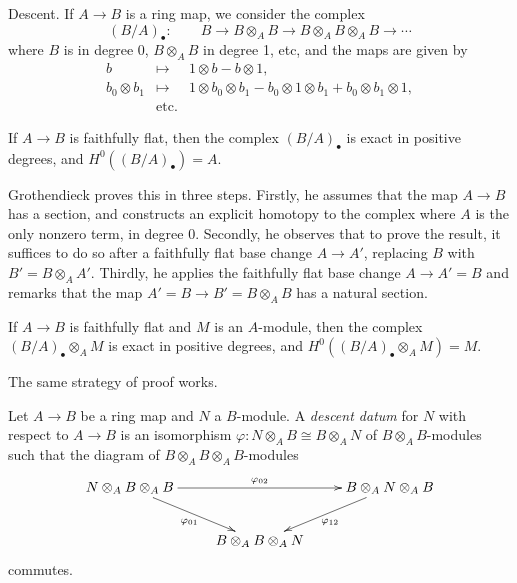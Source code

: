 \medskip\noindent
Descent. If $A \to B$ is a ring map, we consider the complex
$$
(B/A)_\bullet : \qquad B \to B\otimes_A B \to B\otimes_A B \otimes_A B \to 
\cdots
$$
where $B$ is in degree 0, $B\otimes_A B$ in degree 1, etc, and the maps are 
given by 
\begin{eqnarray*}
b & \mapsto  & 1 \otimes b - b \otimes 1, \\
b_0 \otimes b_1 &  \mapsto & 1 \otimes b_0 \otimes b_1 - b_0 \otimes 1 \otimes 
b_1 + b_0 \otimes b_1 \otimes 1, \\
& \text{etc.}
\end{eqnarray*}

\begin{lemma}
\label{lemma-algebra-descent}
If $A \to B$ is faithfully flat, then the complex $(B/A)_\bullet$ is exact in 
positive degrees, and $H^0((B/A)_\bullet) = A$.
\end{lemma}

\noindent
Grothendieck proves this in three steps. Firstly, he assumes that the map $A 
\to B$ has a section, and constructs an explicit homotopy to the complex where 
$A$ is the only nonzero term, in degree 0. Secondly, he observes that to prove 
the result, it suffices to do so after a faithfully flat base change $A \to 
A'$,  replacing $B$ with $B' = B \otimes_A A'$. Thirdly, he applies the 
faithfully flat base change $A \to A' =B$ and remarks that the map $A' = B \to 
B' = B\otimes_A B$ has a natural section.

\begin{lemma}
\label{lemma-descent-modules}
If $A \to B$ is faithfully flat and $M$ is an $A$-module, then the
complex $(B/A)_\bullet \otimes_A M$ is exact in positive degrees, and 
$H^0((B/A)_\bullet \otimes_A M) = M$.
\end{lemma}

\noindent
The same strategy of proof works.

\begin{definition}
\label{definition-descent-datum-modules}
Let $A \to B$ be a ring map and $N$ a $B$-module. A {\it descent datum} for 
$N$ with respect to $A \to B$ is an isomorphism $\varphi: N\otimes_A B \cong 
B\otimes_A N$ of $B\otimes_A B$-modules such that the diagram of $B\otimes_A B 
\otimes_A B$-modules
$$
\xymatrix{
{N \otimes_A  B \otimes_A B} \ar_{\varphi_{01}}[dr] \ar^{\varphi_{02}}[rr] & & 
{B \otimes_A  N \otimes_A B}\ar^{\varphi_{12}}[dl] \\
& {B \otimes_A  B \otimes_A N}  
}
$$ 
commutes.
\end{definition}

